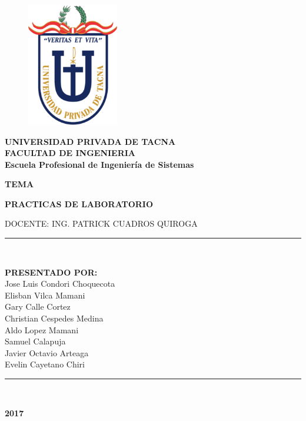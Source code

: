 \documentclass[a4paper,openright,12pt]{book}
\begin{document}
\begin{titlepage}
\begin{center}
\begin{figure}[htb]
\begin{center}
\includegraphics[width=4cm]{./images/upt}
\end{center}
\end{figure}

\textbf{UNIVERSIDAD PRIVADA DE TACNA}\\
\vspace*{0.10in}
\textbf{FACULTAD DE INGENIERIA}\\
\textbf{Escuela Profesional de Ingeniería de Sistemas}\\
\vspace*{0.2in}
\begin{large}
\textbf{TEMA}\\
\end{large}
\vspace*{0.2in}
\begin{Large}
\textbf{PRACTICAS DE LABORATORIO} \\
\end{Large}
\vspace*{0.3in}
\begin{large}
DOCENTE: ING. PATRICK CUADROS QUIROGA\\
\end{large}
\vspace*{0.3in}
\rule{80mm}{0.1mm}\\
\vspace*{0.1in}
\begin{large}
\textbf{PRESENTADO POR:} \\
Jose Luis Condori Choquecota \\
Elisban Vilca Mamani\\
Gary Calle Cortez\\
Christian Cespedes Medina\\
Aldo Lopez Mamani\\
Samuel Calapuja\\
Javier Octavio Arteaga\\
Evelin Cayetano Chiri\\

\end{large}
\rule{80mm}{0.1mm}\\
\begin{large}
\textbf{2017}\\
\end{large}
\end{center}
\end{titlepage}
\end{document}
